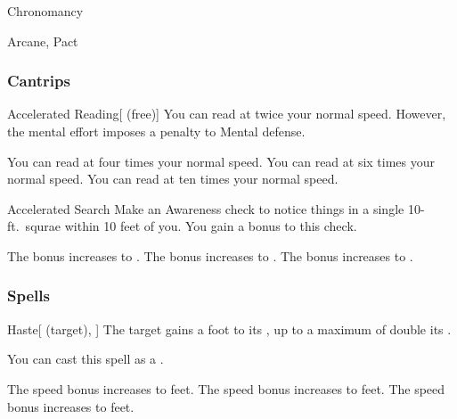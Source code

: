 \newpage
\begin{spellsection}{Chronomancy}

\begin{spellheader}
\end{spellheader}


 Arcane, Pact

\subsubsection{Cantrips}


\begin{freeability}{Accelerated Reading}[ (free)]
You can read at twice your normal speed.
However, the mental effort imposes a  penalty to Mental defense.

\rankline
{} You can read at four times your normal speed.
 You can read at six times your normal speed.
 You can read at ten times your normal speed.
\end{freeability}


\begin{freeability}{Accelerated Search}
Make an Awareness check to notice things in a single 10-ft.\ squrae within 10 feet of you.
You gain a  bonus to this check.

\rankline
{} The bonus increases to .
 The bonus increases to .
 The bonus increases to .
\end{freeability}

\end{spellsection}


\subsubsection{Spells}


\lowercase{\hypertarget{spell:Haste}{}}\label{spell:Haste}
\begin{attuneability}[Rank 1]{\hypertarget{spell:Haste}{Haste}}[ (target), ]
The target gains a  foot  to its , up to a maximum of double its .

You can cast this spell as a .

\rankline
{} The speed bonus increases to  feet.
 The speed bonus increases to  feet.
 The speed bonus increases to  feet.
\end{attuneability}
\vspace{0.25em}



